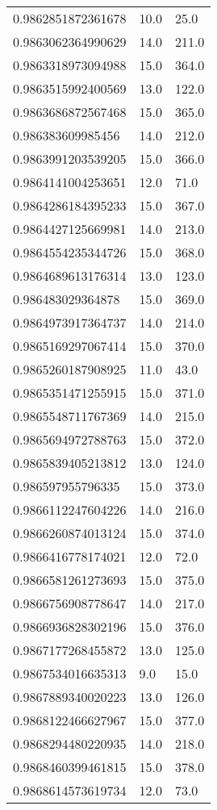 \begin{center}
\begin{supertabular}[H]{p{0.30\textwidth}p{0.05\textwidth}p{0.05\textwidth}}
0.9862851872361678 & 10.0 & 25.0 \\ 
0.9863062364990629 & 14.0 & 211.0 \\ 
0.9863318973094988 & 15.0 & 364.0 \\ 
0.9863515992400569 & 13.0 & 122.0 \\ 
0.9863686872567468 & 15.0 & 365.0 \\ 
0.986383609985456 & 14.0 & 212.0 \\ 
0.9863991203539205 & 15.0 & 366.0 \\ 
0.9864141004253651 & 12.0 & 71.0 \\ 
0.9864286184395233 & 15.0 & 367.0 \\ 
0.9864427125669981 & 14.0 & 213.0 \\ 
0.9864554235344726 & 15.0 & 368.0 \\ 
0.9864689613176314 & 13.0 & 123.0 \\ 
0.986483029364878 & 15.0 & 369.0 \\ 
0.9864973917364737 & 14.0 & 214.0 \\ 
0.9865169297067414 & 15.0 & 370.0 \\ 
0.9865260187908925 & 11.0 & 43.0 \\ 
0.9865351471255915 & 15.0 & 371.0 \\ 
0.9865548711767369 & 14.0 & 215.0 \\ 
0.9865694972788763 & 15.0 & 372.0 \\ 
0.9865839405213812 & 13.0 & 124.0 \\ 
0.986597955796335 & 15.0 & 373.0 \\ 
0.9866112247604226 & 14.0 & 216.0 \\ 
0.9866260874013124 & 15.0 & 374.0 \\ 
0.9866416778174021 & 12.0 & 72.0 \\ 
0.9866581261273693 & 15.0 & 375.0 \\ 
0.9866756908778647 & 14.0 & 217.0 \\ 
0.9866936828302196 & 15.0 & 376.0 \\ 
0.9867177268455872 & 13.0 & 125.0 \\ 
0.9867534016635313 & 9.0 & 15.0 \\ 
0.9867889340020223 & 13.0 & 126.0 \\ 
0.9868122466627967 & 15.0 & 377.0 \\ 
0.9868294480220935 & 14.0 & 218.0 \\ 
0.9868460399461815 & 15.0 & 378.0 \\ 
0.9868614573619734 & 12.0 & 73.0 \\ 

\end{supertabular}
\end{center}
